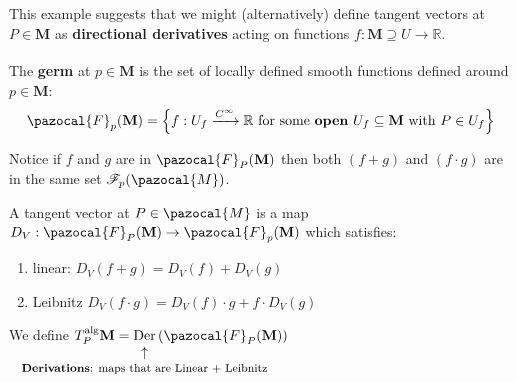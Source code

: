 \documentclass[../main.tex]{subfiles}
\begin{document}
This example suggests that we might (alternatively) define tangent vectors at $P \in\mathbf{M}$ as \textbf{directional derivatives} acting on functions $f:\mathbf{M}\supseteq U\xrightarrow[]{}\mathbb{R}$.
\begin{definition}
The \textbf{germ} at $p \in\mathbf{M}$ is the set of locally defined smooth functions defined around $p \in\mathbf{M}$:
\[
\pazocal{F}_p(\mathbf{M})=\left\{f:U_f\xrightarrow{C^\infty}\mathbb{R}\text{ for some \textbf{open} } U_f\subseteq\mathbf{M}\text{ with } P \in U_f\right\}
\]
\end{definition}
Notice if $f$ and $g$ are in $\pazocal{F}_P(\mathbf{M})$ then both $(f+g)$ and $(f\cdot g)$ are in the same set $\mathcal{F}_p(\pazocal{M})$.
\begin{definition}
A tangent vector at $P \in\pazocal{M}$ is a map $D_V:\pazocal{F}_P(\mathbf{M})\to\pazocal{F}_p(\mathbf{M})$ which satisfies:
\begin{enumerate}
    \item linear:  $D_V(f+g)=D_V(f)+D_V(g)$
    \item Leibnitz $D_V(f\cdot g)=D_V(f)\cdot g+f\cdot D_V(g)$
\end{enumerate}
\end{definition}
\begin{definition}
We define
\(
T_P^{\textrm{alg}}\mathbf{M}=\underset{\mathclap{\tikz \node {$\uparrow$} node [below=1ex] {\footnotesize \textbf{Derivations}: maps that are Linear + Leibnitz};}}{\textrm{Der}}\left(\pazocal{F}_P(\mathbf{M})\right)
\)
\end{definition}
\end{document}
